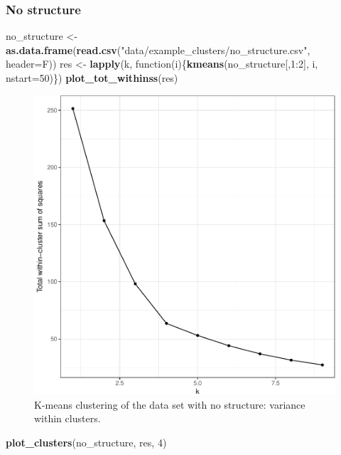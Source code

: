 \documentclass[]{book}
\newenvironment{Shaded}{\begin{snugshade}}{\end{snugshade}}
\newcommand{\KeywordTok}[1]{\textcolor[rgb]{0.13,0.29,0.53}{\textbf{{#1}}}}
\newcommand{\DataTypeTok}[1]{\textcolor[rgb]{0.13,0.29,0.53}{{#1}}}
\newcommand{\DecValTok}[1]{\textcolor[rgb]{0.00,0.00,0.81}{{#1}}}
\newcommand{\StringTok}[1]{\textcolor[rgb]{0.31,0.60,0.02}{{#1}}}
\newcommand{\NormalTok}[1]{{#1}}
\theoremstyle{definition}
\theoremstyle{definition}
\theoremstyle{definition}
\theoremstyle{remark}
\begin{document}
\subsubsection{No structure}\label{no-structure}

\begin{Shaded}
\begin{Highlighting}[]
\NormalTok{no_structure <-}\StringTok{ }\KeywordTok{as.data.frame}\NormalTok{(}\KeywordTok{read.csv}\NormalTok{(}\StringTok{"data/example_clusters/no_structure.csv"}\NormalTok{, }\DataTypeTok{header=}\NormalTok{F))}
\NormalTok{res <-}\StringTok{ }\KeywordTok{lapply}\NormalTok{(k, function(i)\{}\KeywordTok{kmeans}\NormalTok{(no_structure[,}\DecValTok{1}\NormalTok{:}\DecValTok{2}\NormalTok{], i, }\DataTypeTok{nstart=}\DecValTok{50}\NormalTok{)\})}
\KeywordTok{plot_tot_withinss}\NormalTok{(res)}
\end{Highlighting}
\end{Shaded}

\begin{figure}

{\centering \includegraphics[width=0.5\linewidth]{09-clustering_files/figure-latex/noStructureElbow-1} 

}

\caption{K-means clustering of the data set with no structure: variance within clusters.}\label{fig:noStructureElbow}
\end{figure}

\begin{Shaded}
\begin{Highlighting}[]
\KeywordTok{plot_clusters}\NormalTok{(no_structure, res, }\DecValTok{4}\NormalTok{)}
\end{Highlighting}
\end{Shaded}
\end{document}
